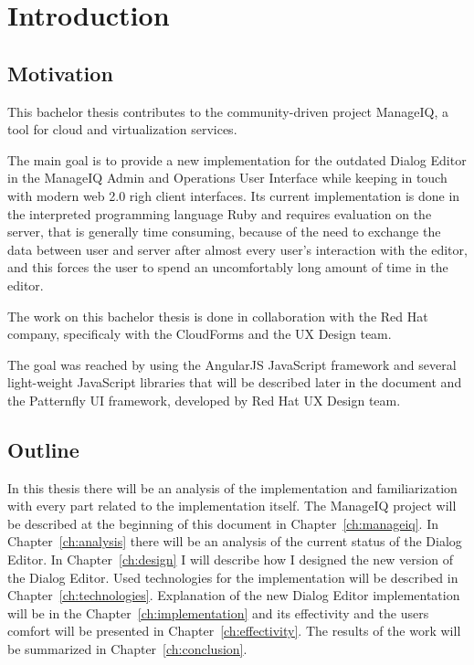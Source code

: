 \chapter{Introduction}

\section{Motivation}

This bachelor thesis contributes to the community-driven project ManageIQ,
a tool for cloud and virtualization services.

The main goal is to provide a new implementation for the outdated Dialog Editor
in the ManageIQ Admin and Operations User Interface while keeping in touch with
modern web 2.0 righ client interfaces.
Its current implementation is done in the interpreted programming language Ruby
and requires evaluation on the server, that is generally time consuming,
because of the need to exchange the data between user and server after almost
every user's interaction with the editor, and this forces the user to spend
an uncomfortably long amount of time in the editor.

The work on this bachelor thesis is done in collaboration with the Red Hat
company, specificaly with the CloudForms and the UX Design team.

The goal was reached by using the AngularJS JavaScript framework and several
light-weight JavaScript libraries that will be described later in the document
and the Patternfly UI framework, developed by Red Hat UX Design team.

\section{Outline}

In this thesis there will be an analysis of the implementation and
familiarization with every part related to the implementation itself.
The ManageIQ project will be described at the beginning of this document in
Chapter~\ref{ch:manageiq}.
In Chapter~\ref{ch:analysis} there will be an analysis of the current status
of the Dialog Editor.
In Chapter~\ref{ch:design} I will describe how I designed the new version
of the Dialog Editor.
Used technologies for the implementation will be described in
Chapter~\ref{ch:technologies}. Explanation of the new Dialog Editor
implementation will be in the Chapter~\ref{ch:implementation} and its
effectivity and the users comfort will be presented in
Chapter~\ref{ch:effectivity}. The results of the work will be summarized in
Chapter~\ref{ch:conclusion}.

